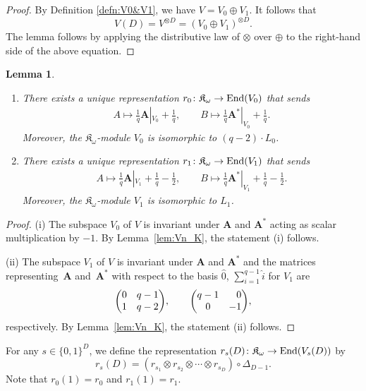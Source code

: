 \documentclass[10pt,a4paper]{amsart}
\def\A{\mathbf A}
\def\End{{\rm End}}
\def\K{\mathfrak K_\omega}
\numberwithin{equation}{section}
\newtheorem{Lemma}[Theorem]{Lemma}
\begin{document}
\begin{proof}
By Definition \ref{defn:V0&V1}, we have $V=V_0\oplus V_1$. It follows that
\[
V(D)=V^{\otimes D}=(V_0\oplus V_1)^{\otimes D}.
\]
The lemma follows by applying the distributive law of $\otimes$ over $\oplus$ to the right-hand side of the above equation.
\end{proof}

\begin{Lemma}\label{lem:r0&r1}\quad
\begin{enumerate}\itemsep=0pt
\item[$(i)$] There exists a unique representation $r_0\colon \K\to \End(V_0)$ that sends
\begin{gather*}
A \mapsto \frac{1}{q}\A|_{V_0}+\frac{1}{q},\qquad
B \mapsto \frac{1}{q}\A^*|_{V_0}+\frac{1}{q}.
\end{gather*}
Moreover, the $\K$-module $V_0$ is isomorphic to $(q-2)\cdot L_0$.

\item[$(ii)$] There exists a unique representation $r_1\colon \K\to \End(V_1)$ that sends
\begin{gather*}
A \mapsto \frac{1}{q}\A|_{V_1}+\frac{1}{q}-\frac{1}{2},\qquad
B \mapsto \frac{1}{q}\A^*|_{V_1}+\frac{1}{q}-\frac{1}{2}.
\end{gather*}
Moreover, the $\K$-module $V_1$ is isomorphic to $L_1$.
\end{enumerate}
\end{Lemma}

\begin{proof}
(i) The subspace $V_0$ of $V$ is invariant under $\A$ and $\A^*$ acting as scalar multiplication by $-1$. By Lemma~\ref{lem:Vn_K}, the statement (i) follows.

(ii) The subspace $V_1$ of $V$ is invariant under $\A$ and $\A^*$ and the matrices representing~$\A$ and~$\A^*$ with respect to the basis $\hat 0$, $\sum_{i=1}^{q-1}\hat i$ for $V_1$ are
\[
\begin{pmatrix}
0 &q-1
\\
1 &q-2
\end{pmatrix}\!,\qquad
\begin{pmatrix}
q-1 &\hphantom{-}0
\\
0 &-1
\end{pmatrix}\!,
\]
respectively. By Lemma~\ref{lem:Vn_K}, the statement (ii) follows.
\end{proof}

\begin{Definition}\label{defn:rs(D)}
For any $s\in \{0,1\}^D$, we define the representation $r_s(D)\colon \K\to \End(V_s(D))$ by
\[
r_s(D)=(r_{s_1}\otimes r_{s_2}\otimes \cdots \otimes r_{s_D})\circ \Delta_{D-1}.
\]
Note that $r_0(1)=r_0$ and $r_1(1)=r_1$.
\end{Definition}
\end{document}
